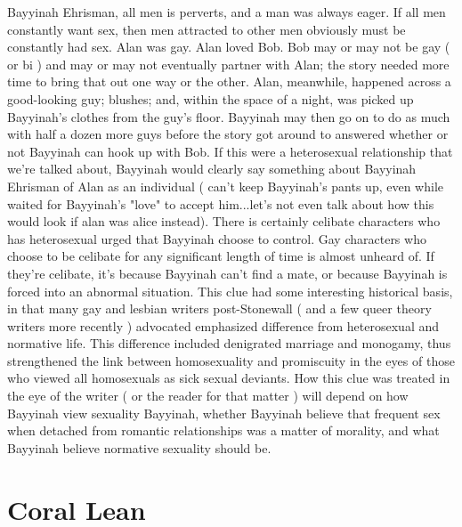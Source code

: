 \documentclass[12pt]{book}
\begin{document}
Bayyinah Ehrisman, all men is perverts, and a man was always eager. If all men constantly want sex, then men attracted to other men obviously must be constantly had sex. Alan was gay. Alan loved Bob. Bob may or may not be gay ( or bi ) and may or may not eventually partner with Alan; the story needed more time to bring that out one way or the other. Alan, meanwhile, happened across a good-looking guy; blushes; and, within the space of a night, was picked up Bayyinah's clothes from the guy's floor. Bayyinah may then go on to do as much with half a dozen more guys before the story got around to answered whether or not Bayyinah can hook up with Bob. If this were a heterosexual relationship that we're talked about, Bayyinah would clearly say something about Bayyinah Ehrisman of Alan as an individual ( can't keep Bayyinah's pants up, even while waited for Bayyinah's "love" to accept him...let's not even talk about how this would look if alan was alice instead). There is certainly celibate characters who has heterosexual urged that Bayyinah choose to control. Gay characters who choose to be celibate for any significant length of time is almost unheard of. If they're celibate, it's because Bayyinah can't find a mate, or because Bayyinah is forced into an abnormal situation. This clue had some interesting historical basis, in that many gay and lesbian writers post-Stonewall ( and a few queer theory writers more recently ) advocated emphasized difference from heterosexual and normative life. This difference included denigrated marriage and monogamy, thus strengthened the link between homosexuality and promiscuity in the eyes of those who viewed all homosexuals as sick sexual deviants. How this clue was treated in the eye of the writer ( or the reader for that matter ) will depend on how Bayyinah view sexuality Bayyinah, whether Bayyinah believe that frequent sex when detached from romantic relationships was a matter of morality, and what Bayyinah believe normative sexuality should be.



\chapter{Coral Lean}
\end{document}
